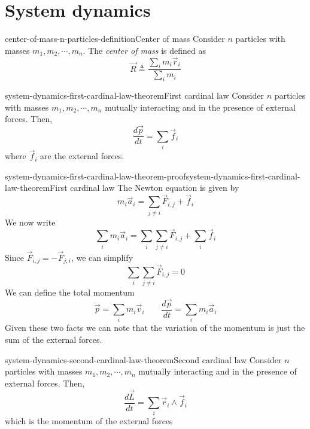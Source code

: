 \documentclass[preview]{standalone}
\begin{document}
\genpage

\section{System dynamics}

\begin{snippetdefinition}{center-of-mass-n-particles-definition}{Center of mass}
    Consider \(n\) particles with masses \(m_1, m_2, \cdots, m_n\).
    The \emph{center of mass} is defined as
    \[
        \vec{R} \triangleq \frac{\sum_i m_i\vec{r}_i}{\sum_i m_i}
    \]
\end{snippetdefinition}

\begin{snippettheorem}{system-dynamics-first-cardinal-law-theorem}{First cardinal law}
    Consider \(n\) particles with masses \(m_1, m_2, \cdots, m_n\) mutually interacting and in the presence of
    external forces. Then,
    \[
        \frac{d\vec{p}}{dt} = \sum_i \vec{f}_i
    \]
    where \(\vec{f}_i\) are the external forces.
\end{snippettheorem}

\begin{snippetproof}{system-dynamics-first-cardinal-law-theorem-proof}{system-dynamics-first-cardinal-law-theorem}{First cardinal law}
    The Newton equation is given by
    \[
        m_i\vec{a}_i = \sum_{j \neq i} \vec{F}_{i,j} + \vec{f}_{i}
    \]
    We now write
    \[
        \sum_i m_i\vec{a}_i = \sum_i \sum_{j \neq i} \vec{F}_{i,j} + \sum_i \vec{f}_i
    \]
    Since \(\vec{F}_{i,j} = -\vec{F}_{j,i}\), we can simplify
    \[
        \sum_i \sum_{j \neq i} \vec{F}_{i,j} = 0
    \]
    We can define the total momentum
    \[
        \vec{p} = \sum_i m_i\vec{v}_i \qquad \frac{d\vec{p}}{dt} = \sum_i m_i\vec{a}_i
    \]
    Given these two facts we can note that the variation of the momentum is just the sum
    of the external forces.
\end{snippetproof}

\begin{snippettheorem}{system-dynamics-second-cardinal-law-theorem}{Second cardinal law}
    Consider \(n\) particles with masses \(m_1, m_2, \cdots, m_n\) mutually interacting and in the presence of
    external forces. Then,
    \[
        \frac{d\vec{L}}{dt} = \sum_i \vec{r}_i \wedge \vec{f}_i
    \]
    which is the momentum of the external forces
\end{snippettheorem}
\end{document}
